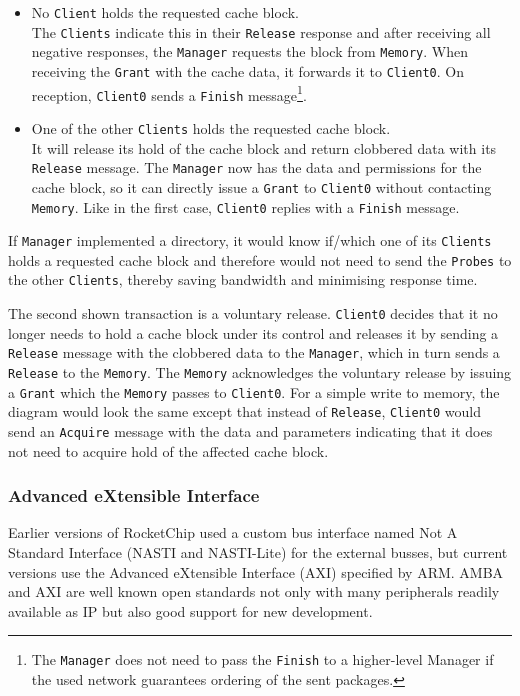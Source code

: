 \documentclass[journal,a4paper]{IEEEtran}
\makeatletter
\newcommand\footnoteref[1]{\protected@xdef\@thefnmark{\ref{#1}}\@footnotemark}
\makeatother
\begin{document}
\begin{itemize}
	\item No \texttt{Client} holds the requested cache block.\\
		The \texttt{Clients} indicate this in their \texttt{Release} response and after receiving all negative responses, the \texttt{Manager} requests the block from \texttt{Memory}.
		When receiving the \texttt{Grant} with the cache data, it forwards it to \texttt{Client0}. On reception, \texttt{Client0} sends a \texttt{Finish} message\footnote{\label{no-finish-propagation}The \texttt{Manager} does not need to pass the \texttt{Finish} to a higher-level Manager if the used network guarantees ordering of the sent packages.}.
	\item One of the other \texttt{Clients} holds the requested cache block.\\
		It will release its hold of the cache block and return clobbered data with its \texttt{Release} message.
		The \texttt{Manager} now has the data and permissions for the cache block, so it can directly issue a \texttt{Grant} to \texttt{Client0} without contacting \texttt{Memory}. Like in the first case, \texttt{Client0} replies with a \texttt{Finish} message.\footnoteref{no-finish-propagation}
\end{itemize}
If \texttt{Manager} implemented a directory, it would know if/which one of its \texttt{Clients} holds a requested cache block and therefore would not need to send the \texttt{Probes} to the other \texttt{Clients}, thereby saving bandwidth and minimising response time.

The second shown transaction is a voluntary release. \texttt{Client0} decides that it no longer needs to hold a cache block under its control and releases it by sending a \texttt{Release} message with the clobbered data to the \texttt{Manager}, which in turn sends a \texttt{Release} to the \texttt{Memory}.
The \texttt{Memory} acknowledges the voluntary release by issuing a \texttt{Grant} which the \texttt{Memory} passes to \texttt{Client0}.
For a simple write to memory, the diagram would look the same except that instead of \texttt{Release}, \texttt{Client0} would send an \texttt{Acquire} message with the data and parameters indicating that it does not need to acquire hold of the affected cache block.

\subsubsection{Advanced eXtensible Interface}
Earlier versions of RocketChip used a custom bus interface named Not A Standard Interface (NASTI and NASTI-Lite) for the external busses, but current versions use the Advanced eXtensible Interface (AXI) specified by ARM\cite{axi}.
AMBA and AXI are well known open standards not only with many peripherals readily available as IP\cite{axi-ip} but also good support for new development\cite{axi-tools}.
\end{document}
